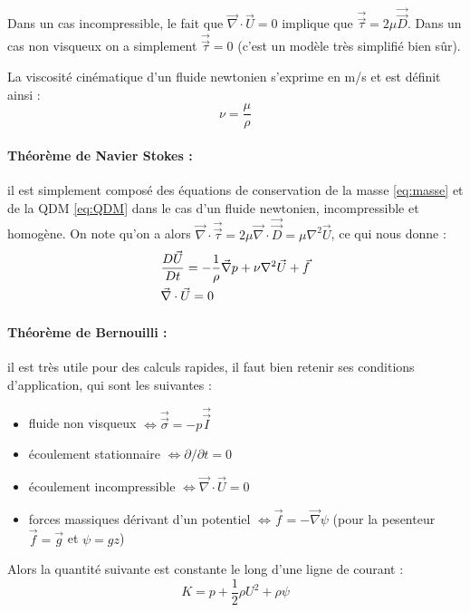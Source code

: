 Dans un cas incompressible, le fait que $\vec{\nabla} \cdot \vec{U} = 0$ implique que $\vec{\vec{\tau}} = 2 \mu \vec{\vec{D}}$. Dans un cas non visqueux on a simplement $\vec{\vec{\tau}} = 0$ (c'est un modèle très simplifié bien sûr).


La viscosité cinématique d'un fluide newtonien s'exprime en m/s et est définit ainsi :
%
\begin{equation}
    \nu = \frac{\mu}{\rho}
\end{equation}

\paragraph{Théorème de Navier Stokes :}il est simplement composé des équations de conservation de la masse \eqref{eq:masse} et de la QDM \eqref{eq:QDM} dans le cas d'un fluide newtonien, incompressible et homogène. On note qu'on a alors $\vec{\nabla} \cdot \vec{\vec{\tau}} = 2 \mu \vec{\nabla} \cdot \vec{\vec{D}} = \mu \nabla^2 \vec{U}$, ce qui nous donne :
%
\begin{align}[left=\empheqlbrace]
    \label{eq:navierstokes}  %
    & \frac{D\vec{U}}{Dt} = - \frac{1}{\rho} \vec{\nabla} p + \nu  \nabla^2 \vec{U} + \vec{f} \\
    \notag & \vec{\nabla} \cdot \vec{U} = 0
\end{align}


\paragraph{Théorème de Bernouilli :}il est très utile pour des calculs rapides, il faut bien retenir ses conditions d'application, qui sont les suivantes :

\begin{itemize}
    \item fluide non visqueux
    $\Leftrightarrow \vec{\vec{\sigma}}=-p\vec{\vec{I}}$
    \item écoulement stationnaire
    $\Leftrightarrow \partial{}/\partial{t} = 0$
    \item écoulement incompressible
    $\Leftrightarrow \vec{\nabla} \cdot \vec{U} = 0$
    \item forces massiques dérivant d'un potentiel
    $\Leftrightarrow\vec{f} = - \vec{\nabla} \psi$ (pour la pesenteur $\vec{f} = \vec{g}$ et $\psi = g z$)
\end{itemize}
%
Alors la quantité suivante est constante le long d'une ligne de courant :
%
\begin{equation}
    K = p + \frac{1}{2}\rho U^2 + \rho\psi
\label{eq:bernouilli}
\end{equation}

